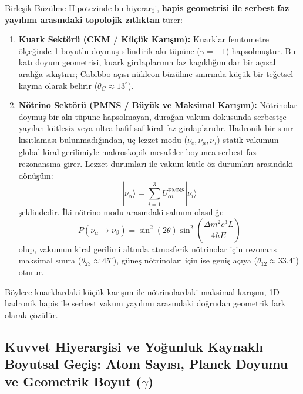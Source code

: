Birleşik Büzülme Hipotezinde bu hiyerarşi, \textbf{hapis geometrisi ile serbest faz yayılımı arasındaki topolojik zıtlıktan} türer:
\begin{enumerate}
    \item \textbf{Kuark Sektörü (CKM / Küçük Karışım):} Kuarklar femtometre ölçeğinde 1-boyutlu doymuş silindirik akı tüpüne ($\gamma = -1$) hapsolmuştur. Bu katı doyum geometrisi, kuark girdaplarının faz kaçıklığını dar bir açısal aralığa sıkıştırır; Cabibbo açısı nükleon büzülme sınırında küçük bir teğetsel kayma olarak belirir ($\theta_C \approx 13^\circ$).
    \item \textbf{Nötrino Sektörü (PMNS / Büyük ve Maksimal Karışım):} Nötrinolar doymuş bir akı tüpüne hapsolmayan, durağan vakum dokusunda serbestçe yayılan kütlesiz veya ultra-hafif saf kiral faz girdaplarıdır. Hadronik bir sınır kısıtlaması bulunmadığından, üç lezzet modu ($\nu_e, \nu_\mu, \nu_\tau$) statik vakumun global kiral gerilimiyle makroskopik mesafeler boyunca serbest faz rezonansına girer. Lezzet durumları ile vakum kütle öz-durumları arasındaki dönüşüm:
          \begin{equation}
              |\nu_\alpha\rangle = \sum_{i=1}^3 U_{\alpha i}^{\mathrm{PMNS}} |\nu_i\rangle
              \label{eq:pmns_donusum}
          \end{equation}
          şeklindedir. İki nötrino modu arasındaki salınım olasılığı:
          \begin{equation}
              P(\nu_\alpha \to \nu_\beta) = \sin^2(2\theta) \sin^2\left( \frac{\Delta m^2 c^3 L}{4 \hbar E} \right)
              \label{eq:notrino_salinim}
          \end{equation}
          olup, vakumun kiral gerilimi altında atmosferik nötrinolar için rezonans maksimal sınıra ($\theta_{23} \approx 45^\circ$), güneş nötrinoları için ise geniş açıya ($\theta_{12} \approx 33.4^\circ$) oturur.
\end{enumerate}
Böylece kuarklardaki küçük karışım ile nötrinolardaki maksimal karışım, 1D hadronik hapis ile serbest vakum yayılımı arasındaki doğrudan geometrik fark olarak çözülür.

\subsection{Kuvvet Hiyerarşisi ve Yoğunluk Kaynaklı Boyutsal Geçiş: Atom Sayısı, Planck Doyumu ve Geometrik Boyut (\texorpdfstring{$\gamma$}{gamma})}
\label{sec:boyutsal_gecis_main}

